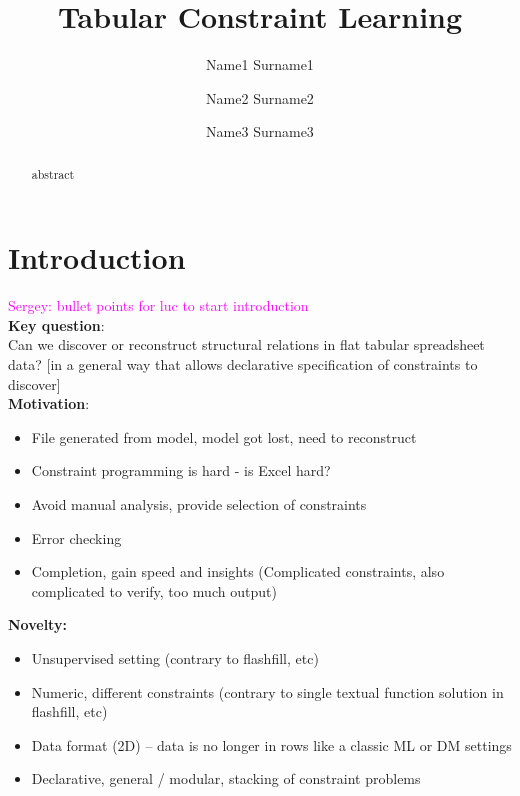 \documentclass{ecai}
\newcommand{\sergey}[1]{\textcolor{magenta}{{\sc Sergey:} #1}\xspace}
\begin{document}
\title{Tabular Constraint Learning}

\author{Name1 Surname1 \and Name2 Surname2 \and Name3 Surname3  }

\maketitle

\begin{abstract}
  abstract
  \end{abstract}
\section{Introduction}
\sergey{bullet points for luc to start introduction}\\
\textbf{Key question}:\\
Can we discover or reconstruct structural relations in flat tabular spreadsheet data? [in a general way that allows declarative specification of constraints to discover]\\


\textbf{Motivation}:
\begin{itemize}
  \item File generated from model, model got lost, need to reconstruct
  \item Constraint programming is hard - is Excel hard?
  \item Avoid manual analysis, provide selection of constraints
  \item Error checking
  \item Completion, gain speed and insights (Complicated constraints, also complicated to verify, too much output)
\end{itemize}

\textbf{Novelty:}
\begin{itemize}
  \item Unsupervised setting (contrary to flashfill, etc)
  \item Numeric, different constraints (contrary to single textual function solution in flashfill, etc)
  \item Data format (2D) -- data is no longer in rows like a classic ML or DM settings
  \item Declarative, general / modular, stacking of constraint problems 
\end{itemize}
\end{document}
